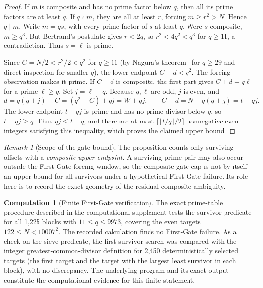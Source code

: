 \documentclass[final,11pt]{elsarticle}
\theoremstyle{definition}
\newtheorem{computation}[theorem]{Computation}
\theoremstyle{remark}
\newtheorem{remark}[theorem]{Remark}
\numberwithin{equation}{section}
\begin{document}
\begin{proof}
If $m$ is composite and has no prime factor below $q$, then
all its prime factors are at least $q$.  If $q\nmid m$, they
are all at least $r$, forcing $m\ge r^2>N$.  Hence $q\mid m$.
Write $m=qs$, with every prime factor of $s$ at least $q$.
Were $s$ composite, $m\ge q^3$.  But Bertrand's postulate
gives $r<2q$, so $r^2<4q^2<q^3$ for $q\ge11$, a contradiction.
Thus $s=\ell$ is prime.

Since $C=N/2<r^2/2<q^2$ for $q\ge11$ (by Nagura's theorem~\cite{Nagura} for $q\ge29$ and direct inspection for smaller $q$),
the lower endpoint $C-d<q^2$.  The forcing observation makes
it prime.  If $C+d$ is composite, the first part gives
$C+d=q\ell$ for a prime $\ell\ge q$.  Set $j=\ell-q$.
Because $q,\ell$ are odd, $j$ is even, and
\[
d=q(q+j)-C=(q^2-C)+qj=W+qj,
\qquad C-d=N-q(q+j)=t-qj.
\]
The lower endpoint $t-qj$ is prime and has no prime divisor below $q$,
so $t-qj\ge q$. Thus $qj\le t-q$, and there
are at most $\lceil\lfloor t/q\rfloor/2\rceil$ nonnegative
even integers satisfying this inequality, which proves the
claimed upper bound.
\end{proof}

\begin{remark}[Scope of the gate bound]
The proposition counts only surviving offsets with a
\emph{composite upper endpoint}.  A surviving prime pair may
also occur outside the First-Gate forcing window, so the
composite-gate cap is not by itself an upper bound for all
survivors under a hypothetical First-Gate failure.  Its role
here is to record the exact geometry of the residual
composite ambiguity.
\end{remark}


\begin{computation}[Finite First-Gate verification]\label{comp:finite}
The exact prime-table procedure described in the computational supplement tests the survivor predicate for all 1,225 blocks with $11\le q\le9973$, covering the even targets $122\le N<10007^2$. The recorded calculation finds no First-Gate failure. As a check on the sieve predicate, the first-survivor search was compared with the integer greatest-common-divisor definition for 2,450 deterministically selected targets (the first target and the target with the largest least survivor in each block), with no discrepancy. The underlying program and its exact output constitute the computational evidence for this finite statement.
\end{computation}
\end{document}
